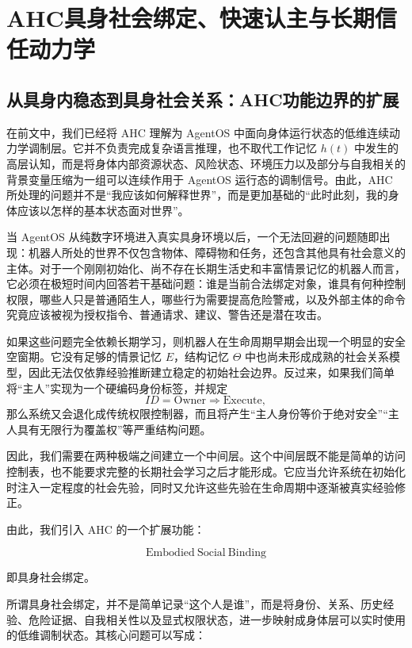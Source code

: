 \chapter{AHC具身社会绑定、快速认主与长期信任动力学}
\label{chap:ahc_social_binding}

\section{从具身内稳态到具身社会关系：AHC功能边界的扩展}

在前文中，我们已经将 AHC 理解为 AgentOS 中面向身体运行状态的低维连续动力学调制层。它并不负责完成复杂语言推理，也不取代工作记忆 $h(t)$ 中发生的高层认知，而是将身体内部资源状态、风险状态、环境压力以及部分与自我相关的背景变量压缩为一组可以连续作用于 AgentOS 运行态的调制信号。由此，AHC 所处理的问题并不是“我应该如何解释世界”，而是更加基础的“此时此刻，我的身体应该以怎样的基本状态面对世界”。

当 AgentOS 从纯数字环境进入真实具身环境以后，一个无法回避的问题随即出现：机器人所处的世界不仅包含物体、障碍物和任务，还包含其他具有社会意义的主体。对于一个刚刚初始化、尚不存在长期生活史和丰富情景记忆的机器人而言，它必须在极短时间内回答若干基础问题：谁是当前合法绑定对象，谁具有何种控制权限，哪些人只是普通陌生人，哪些行为需要提高危险警戒，以及外部主体的命令究竟应该被视为授权指令、普通请求、建议、警告还是潜在攻击。

如果这些问题完全依赖长期学习，则机器人在生命周期早期会出现一个明显的安全空窗期。它没有足够的情景记忆 $E$，结构记忆 $\Theta$ 中也尚未形成成熟的社会关系模型，因此无法仅依靠经验推断建立稳定的初始社会边界。反过来，如果我们简单将“主人”实现为一个硬编码身份标签，并规定
\[
ID=\mathrm{Owner}\Rightarrow \mathrm{Execute},
\]
那么系统又会退化成传统权限控制器，而且将产生“主人身份等价于绝对安全”“主人具有无限行为覆盖权”等严重结构问题。

因此，我们需要在两种极端之间建立一个中间层。这个中间层既不能是简单的访问控制表，也不能要求完整的长期社会学习之后才能形成。它应当允许系统在初始化时注入一定程度的社会先验，同时又允许这些先验在生命周期中逐渐被真实经验修正。

由此，我们引入 AHC 的一个扩展功能：

\[
\boxed{
\mathrm{Embodied\ Social\ Binding}
}
\]

即具身社会绑定。

所谓具身社会绑定，并不是简单记录“这个人是谁”，而是将身份、关系、历史经验、危险证据、自我相关性以及显式权限状态，进一步映射成身体层可以实时使用的低维调制状态。其核心问题可以写成：

